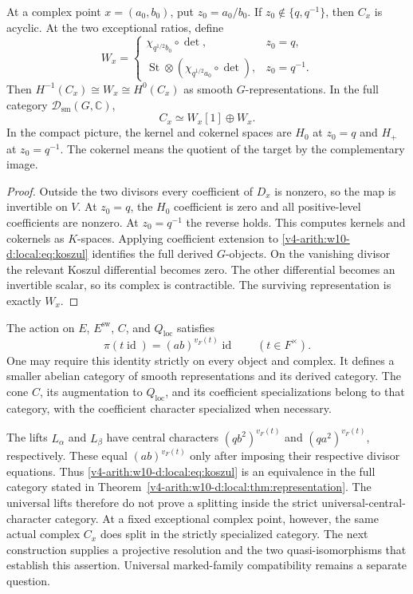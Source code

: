 \begin{proposition}\label{v4-arith:w10-d:local:prop:fibers}
At a complex point $x=(a_0,b_0)$, put $z_0=a_0/b_0$.
If $z_0\notin\{q,q^{-1}\}$, then $C_x$ is acyclic.
At the two exceptional ratios, define
\[
 W_x=\begin{cases}
 \chi_{q^{1/2}b_0}\circ\det,&z_0=q,\\
 \operatorname{St}\otimes(\chi_{q^{1/2}a_0}\circ\det),&z_0=q^{-1}.
 \end{cases}
\]
Then $H^{-1}(C_x)\cong W_x\cong H^0(C_x)$ as smooth $G$-representations.
In the full category $\mathcal D_{\mathrm{sm}}(G,\mathbb C)$,
\[
 C_x\simeq W_x[1]\oplus W_x.
\]
In the compact picture, the kernel and cokernel spaces are $H_0$ at $z_0=q$
and $H_+$ at $z_0=q^{-1}$.
The cokernel means the quotient of the target by the complementary image.
\end{proposition}
\begin{proof}
Outside the two divisors every coefficient of $D_x$ is nonzero, so the map is invertible on $V$.
At $z_0=q$, the $H_0$ coefficient is zero and all positive-level coefficients are nonzero.
At $z_0=q^{-1}$ the reverse holds.
This computes kernels and cokernels as $K$-spaces.
Applying coefficient extension to \eqref{v4-arith:w10-d:local:eq:koszul} identifies the full derived $G$-objects.
On the vanishing divisor the relevant Koszul differential becomes zero.
The other differential becomes an invertible scalar, so its complex is contractible.
The surviving representation is exactly $W_x$.
\end{proof}

\begin{remark}\label{v4-arith:w10-d:local:rem:center}
The action on $E$, $E^\mathrm{sw}$, $C$, and $Q_{\mathrm{loc}}$ satisfies
\[
 \pi(t\operatorname{id})=(ab)^{v_F(t)}\operatorname{id}\qquad(t\in F^\times).
\]
One may require this identity strictly on every object and complex.
It defines a smaller abelian category of smooth representations and its derived category.
The cone $C$, its augmentation to $Q_{\mathrm{loc}}$, and its coefficient specializations belong to that category,
with the coefficient character specialized when necessary.

The lifts $L_\alpha$ and $L_\beta$ have central characters
$(qb^2)^{v_F(t)}$ and $(qa^2)^{v_F(t)}$, respectively.
These equal $(ab)^{v_F(t)}$ only after imposing their respective divisor equations.
Thus \eqref{v4-arith:w10-d:local:eq:koszul} is an equivalence in the full category stated in Theorem~\ref{v4-arith:w10-d:local:thm:representation}.
The universal lifts therefore do not prove a splitting inside the
strict universal-central-character category. At a fixed exceptional
complex point, however, the same actual complex $C_x$ does split in
the strictly specialized category. The next construction supplies a
projective resolution and the two quasi-isomorphisms that establish
this assertion. Universal marked-family compatibility remains a
separate question.
\end{remark}

